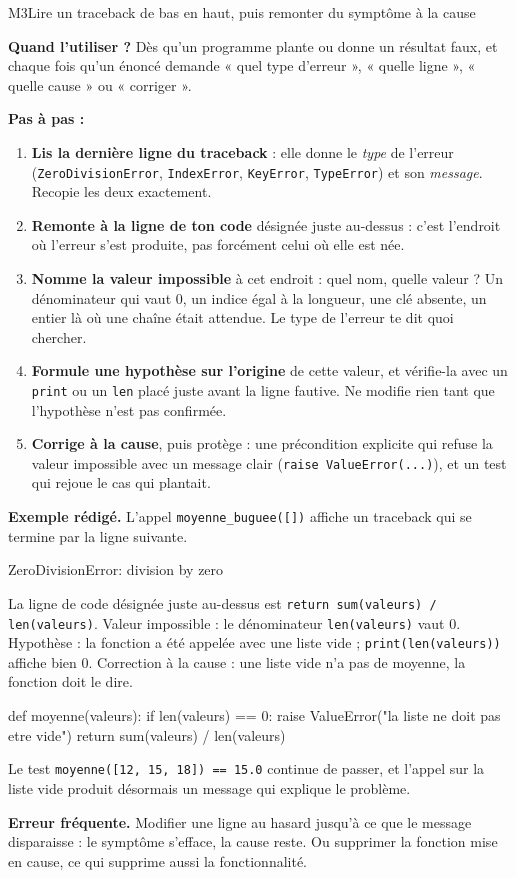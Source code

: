 \begin{fichemethode}{M3}{Lire un traceback de bas en haut, puis remonter du symptôme à la cause}

\textbf{Quand l'utiliser ?} Dès qu'un programme plante ou donne un résultat faux, et
chaque fois qu'un énoncé demande « quel type d'erreur », « quelle ligne », « quelle cause »
ou « corriger ».

\textbf{Pas à pas :}
\begin{enumerate}
  \item \textbf{Lis la dernière ligne du traceback} : elle donne le \emph{type} de l'erreur
        (\lstinline{ZeroDivisionError}, \lstinline{IndexError}, \lstinline{KeyError},
        \lstinline{TypeError}) et son \emph{message}. Recopie les deux exactement.
  \item \textbf{Remonte à la ligne de ton code} désignée juste au-dessus : c'est l'endroit
        où l'erreur s'est produite, pas forcément celui où elle est née.
  \item \textbf{Nomme la valeur impossible} à cet endroit : quel nom, quelle valeur ? Un
        dénominateur qui vaut $0$, un indice égal à la longueur, une clé absente, un entier
        là où une chaîne était attendue. Le type de l'erreur te dit quoi chercher.
  \item \textbf{Formule une hypothèse sur l'origine} de cette valeur, et vérifie-la avec un
        \lstinline{print} ou un \lstinline{len} placé juste avant la ligne fautive. Ne
        modifie rien tant que l'hypothèse n'est pas confirmée.
  \item \textbf{Corrige à la cause}, puis protège : une précondition explicite qui refuse la
        valeur impossible avec un message clair (\lstinline{raise ValueError(...)}), et un
        test qui rejoue le cas qui plantait.
\end{enumerate}

\textbf{Exemple rédigé.} L'appel \lstinline{moyenne_buguee([])} affiche un traceback qui
se termine par la ligne suivante.
\begin{console}
ZeroDivisionError: division by zero
\end{console}
La ligne de code désignée juste au-dessus est
\lstinline{return sum(valeurs) / len(valeurs)}. Valeur impossible : le dénominateur
\lstinline{len(valeurs)} vaut $0$. Hypothèse : la fonction a été appelée avec une liste
vide ; \lstinline{print(len(valeurs))} affiche bien $0$. Correction à la cause : une liste
vide n'a pas de moyenne, la fonction doit le dire.
\begin{python}
def moyenne(valeurs):
    if len(valeurs) == 0:
        raise ValueError("la liste ne doit pas etre vide")
    return sum(valeurs) / len(valeurs)
\end{python}
Le test \lstinline{moyenne([12, 15, 18]) == 15.0} continue de passer, et l'appel sur la
liste vide produit désormais un message qui explique le problème.

\textbf{Erreur fréquente.} Modifier une ligne au hasard jusqu'à ce que le message
disparaisse : le symptôme s'efface, la cause reste. Ou supprimer la fonction mise en cause,
ce qui supprime aussi la fonctionnalité.

\end{fichemethode}
